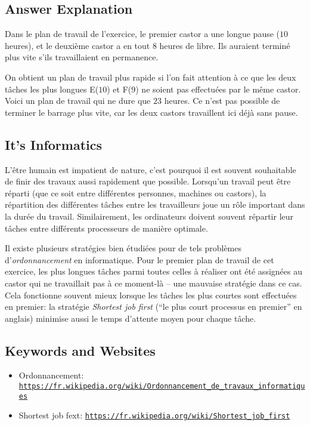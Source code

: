 \documentclass[a4paper,11pt]{report}
\newcommand{\BrochureUrlText}[1]{\texttt{#1}}
\newcommand{\taskGraphicsFolder}{..}
\begin{document}
\endgroup

\subsection*{Answer Explanation}

Dans le plan de travail de l’exercice, le premier castor a une longue pause ($10$ heures), et le deuxième castor a en tout $8$ heures de libre. Ils auraient terminé plus vite s’ils travaillaient en permanence.

On obtient un plan de travail plus rapide si l’on fait attention à ce que les deux tâches les plus longues E($10$) et F($9$) ne soient pas effectuées par le même castor. Voici un plan de travail qui ne dure que $23$ heures. Ce n’est pas possible de terminer le barrage plus vite, car les deux castors travaillent ici déjà sans pause.

{\centering%
\par}


\subsection*{It’s Informatics}

L’être humain est impatient de nature, c’est pourquoi il est souvent souhaitable de finir des travaux aussi rapidement que possible. Lorsqu’un travail peut être réparti (que ce soit entre différentes personnes, machines ou castors), la répartition des différentes tâches entre les travailleurs joue un rôle important dans la durée du travail. Similairement, les ordinateurs doivent souvent répartir leur tâches entre différents processeurs de manière optimale.

Il existe plusieurs stratégies bien étudiées pour de tels problèmes d’\emph{ordonnancement} en informatique. Pour le premier plan de travail de cet exercice, les plus longues tâches parmi toutes celles à réaliser ont été assignées au castor qui ne travaillait pas à ce moment-là – une mauvaise stratégie dans ce cas. Cela fonctionne souvent mieux lorsque les tâches les plus courtes sont effectuées en premier: la stratégie \emph{Shortest job first} (“le plus court processus en premier” en anglais) minimise aussi le temps d’attente moyen pour chaque tâche.

{\raggedright

\subsection*{Keywords and Websites}

\begin{itemize}
  \item Ordonnancement: \href{https://fr.wikipedia.org/wiki/Ordonnancement_de_travaux_informatiques}{\BrochureUrlText{https://fr.wikipedia.org/wiki/Ordonnancement\_de\_travaux\_informatiques}}
  \item Shortest job fext: \href{https://fr.wikipedia.org/wiki/Shortest_job_first}{\BrochureUrlText{https://fr.wikipedia.org/wiki/Shortest\_job\_first}}
\end{itemize}


}
\end{document}
